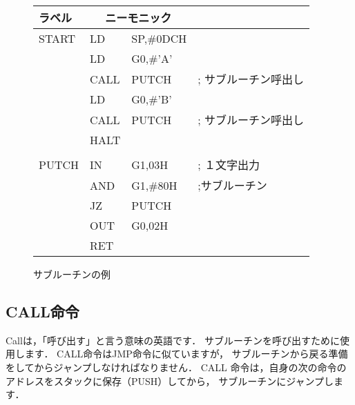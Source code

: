\begin{figure}[bt]
{\tt\small\begin{center}
\begin{tabular}{|l|l l l|}
\hline
ラベル & \multicolumn{2}{|c}{ニーモニック} & \\\hline
START & LD   & SP,\#0DCH  &                      \\
      & LD   & G0,\#'A'   &                      \\
      & CALL & PUTCH      & ; サブルーチン呼出し \\
      & LD   & G0,\#'B'   &                      \\
      & CALL & PUTCH      & ; サブルーチン呼出し \\
      & HALT &            &                      \\
      &      &            &                      \\
PUTCH & IN   & G1,03H     & ; １文字出力         \\
      & AND  & G1,\#80H   & ;サブルーチン        \\
      & JZ   & PUTCH      &                      \\
      & OUT  & G0,02H     &                      \\
      & RET  &            &                      \\\hline
\end{tabular}
\end{center}}
\caption{サブルーチンの例}
\label{fig:chap6:sub}
\end{figure}

\subsection{CALL命令}

Callは，「呼び出す」と言う意味の英語です．
サブルーチンを呼び出すために使用します．
CALL命令はJMP命令に似ていますが，
サブルーチンから戻る準備をしてからジャンプしなければなりません．
CALL 命令は，自身の次の命令のアドレスをスタックに保存（PUSH）してから，
サブルーチンにジャンプします．

